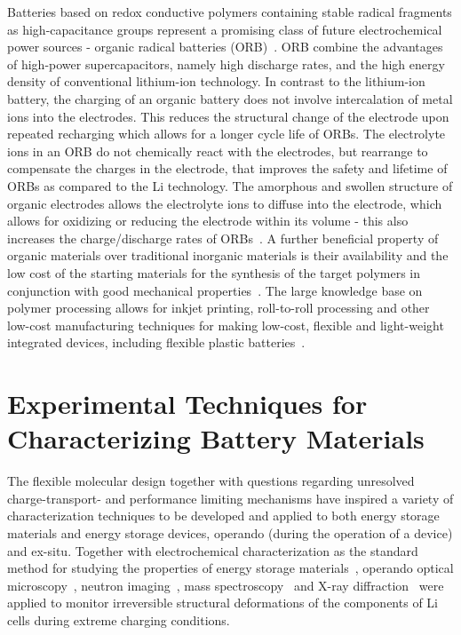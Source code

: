 Batteries based on redox conductive polymers containing stable radical fragments as high-capacitance groups represent a promising class of future electrochemical power sources - organic radical batteries (ORB)~\cite{nakahara2002_cpl, nishide2004_electact,xie2021_mathoriz,Rohland_2021}. ORB combine the advantages of high-power supercapacitors, namely high discharge rates, and the high energy density of conventional lithium-ion technology. In contrast to the lithium-ion battery, the charging of an organic battery does not involve intercalation of metal ions into the electrodes. This reduces the structural change of the electrode upon repeated recharging which allows for a longer cycle life of ORBs. The electrolyte ions in an ORB do not chemically react with the electrodes, but rearrange to compensate the charges in the electrode, that improves the safety and lifetime of ORBs as compared to the Li technology. The amorphous and swollen structure of organic electrodes allows the electrolyte ions to diffuse into the electrode, which allows for oxidizing or reducing the electrode within its volume - this also increases the charge/discharge rates of ORBs~\cite{nishide_2009}. A further beneficial property of organic materials over traditional inorganic materials is their availability and the low cost of the starting materials for the synthesis of the target polymers in conjunction with good mechanical properties~\cite{janoschka2012_advmater, muench2016_chemrev, friebe2017_topcurrchem}. The large knowledge base on polymer processing allows for inkjet printing, roll-to-roll processing and other low-cost manufacturing techniques for making low-cost, flexible and light-weight integrated devices, including flexible plastic batteries~\cite{janoschka2012_advmater,nishide_2009}. 


\section{Experimental Techniques for Characterizing Battery Materials}
The flexible molecular design together with questions regarding unresolved charge-transport- and performance limiting mechanisms have inspired a variety of characterization techniques to be developed and applied to both energy storage materials and energy storage devices, operando (during the operation of a device) and ex-situ. Together with electrochemical characterization as the standard method for studying the properties of energy storage materials~\cite{Bard_book,IWASA2007,Zens2022}, operando optical microscopy~\cite{Merryweather2022}, neutron imaging~\cite{Ma2020}, mass spectroscopy~\cite{Fang_2021} and X-ray diffraction~\cite{Rhodes2012} were applied to monitor irreversible structural deformations of the components of Li cells during extreme charging conditions.\\

